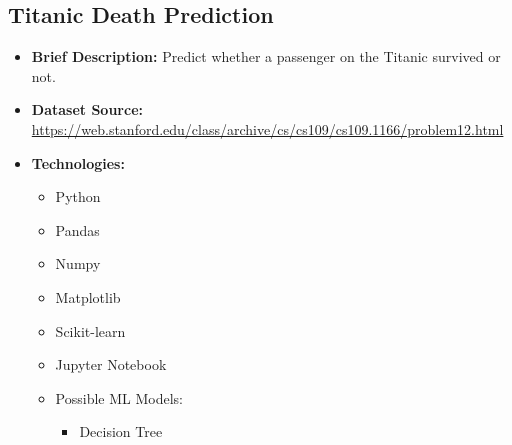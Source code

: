 \documentclass{article}
\begin{document}
\subsection{Titanic Death Prediction}

\begin{itemize}
    \item \textbf{Brief Description:} Predict whether a passenger on the Titanic survived or not.
    \item \textbf{Dataset Source:} \href{https://web.stanford.edu/class/archive/cs/cs109/cs109.1166/problem12.html}{https://web.stanford.edu/class/archive/cs/cs109/cs109.1166/problem12.html}
    \item \textbf{Technologies:}
    \begin{itemize}
        \item Python
        \item Pandas
        \item Numpy
        \item Matplotlib
        \item Scikit-learn
        \item Jupyter Notebook
        \item Possible ML Models:
        \begin{itemize}
            \item Decision Tree
        \end{itemize}
    \end{itemize}
\end{itemize}

\newpage
\printbibliography
\end{document}
